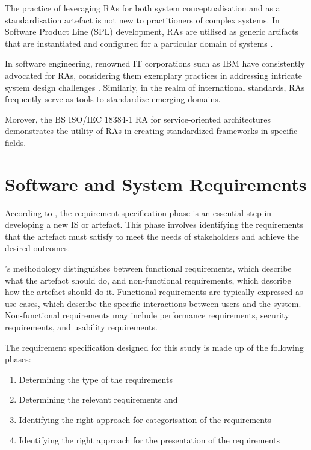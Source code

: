 \documentclass[preprint,12pt]{elsarticle}
\begin{document}
The practice of leveraging RAs for both system conceptualisation and as a standardisation artefact is not new to practitioners of complex systems. In Software Product Line (SPL) development, RAs are utilised as generic artifacts that are instantiated and configured for a particular domain of systems \cite{Derras}. 

In software engineering, renowned IT corporations such as IBM have consistently advocated for RAs, considering them exemplary practices in addressing intricate system design challenges \cite{Cloutier2010}. Similarly, in the realm of international standards, RAs frequently serve as tools to standardize emerging domains. 

Morover, the BS ISO/IEC 18384-1 RA for service-oriented architectures \cite{Iso18384-1} demonstrates the utility of RAs in creating standardized frameworks in specific fields.

\section{Software and System Requirements}
\label{sec:software_and_system_requirements}

According to \citeauthor{wieringa2014design}\cite{wieringa2014design}, the requirement specification phase is an essential step in developing a new IS or artefact. This phase involves identifying the requirements that the artefact must satisfy to meet the needs of stakeholders and achieve the desired outcomes.

\citeauthor{wieringa2014design}'s methodology distinguishes between functional requirements, which describe what the artefact should do, and non-functional requirements, which describe how the artefact should do it. Functional requirements are typically expressed as use cases, which describe the specific interactions between users and the system. Non-functional requirements may include performance requirements, security requirements, and usability requirements.

The requirement specification designed for this study is made up of the following phases: 

\begin{enumerate}
    \item Determining the type of the requirements 
    \item Determining the relevant requirements and 
    \item Identifying the right approach for categorisation of the requirements 
    \item Identifying the right approach for the presentation of the requirements 
\end{enumerate}
\end{document}
